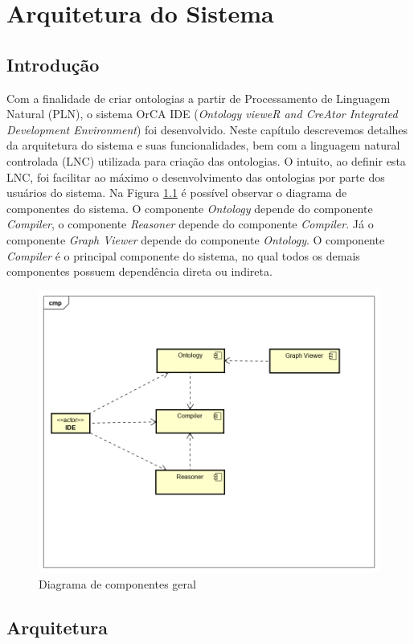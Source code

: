 \documentclass{bcc}
\begin{document}
\chapter{Arquitetura do Sistema}
\label{chap:sistema}

\section{Introdução}
Com a finalidade de criar ontologias a partir de Processamento de Linguagem Natural (PLN), o sistema OrCA IDE (\textit{Ontology vieweR and CreAtor Integrated Development Environment}) foi desenvolvido. Neste capítulo descrevemos detalhes da arquitetura do sistema e suas funcionalidades, bem com a linguagem natural controlada (LNC) utilizada para criação das ontologias. O intuito, ao definir esta LNC, foi facilitar ao máximo o desenvolvimento das ontologias por parte dos usuários do sistema. Na Figura \ref{fig:diagComponenteGeral} é possível observar o diagrama de componentes do sistema. O componente \textit{Ontology} depende do componente \textit{Compiler}, o componente \textit{Reasoner} depende do componente \textit{Compiler}. Já o componente \textit{Graph Viewer} depende do componente \textit{Ontology}. O componente \textit{Compiler} é o principal componente do sistema, no qual todos os demais componentes possuem dependência direta ou indireta.

\begin{figure}[H]
\centering
\includegraphics[width=.7\textwidth]{Figuras/DiagramadeComponentes.png}
\caption{Diagrama de componentes geral}
\label{fig:diagComponenteGeral}
\end{figure}

\section{Arquitetura}
\end{document}
